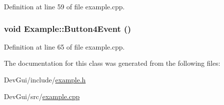 Definition at line 59 of file example.cpp.\hypertarget{classExample_8cc0e75f2b00a8afd0bc056fd2112b23}{
\subsubsection{\setlength{\rightskip}{0pt plus 5cm}void Example::Button4Event ()}}
\label{classExample_8cc0e75f2b00a8afd0bc056fd2112b23}




Definition at line 65 of file example.cpp.

The documentation for this class was generated from the following files:\begin{CompactItemize}
\item 
DevGui/include/\hyperlink{example_8h}{example.h}\item 
DevGui/src/\hyperlink{example_8cpp}{example.cpp}\end{CompactItemize}
